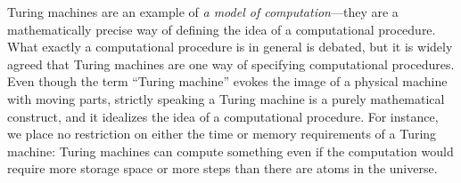 \documentclass[../../../include/open-logic-section]{subfiles}
\begin{document}

Turing machines are an example of \emph{a model of computation}---they
are a mathematically precise way of defining the idea of a
computational procedure.  What exactly a computational procedure is in
general is debated, but it is widely agreed that Turing machines are
one way of specifying computational procedures.  Even though the term
``Turing machine'' evokes the image of a physical machine with moving
parts, strictly speaking a Turing machine is a purely mathematical
construct, and it idealizes the idea of a computational procedure.
For instance, we place no restriction on either the time or memory
requirements of a Turing machine: Turing machines can compute
something even if the computation would require more storage space or
more steps than there are atoms in the universe.
\end{document}
